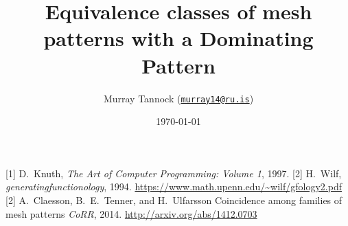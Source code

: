 \documentclass[11pt, aspectratio=1610]{beamer}
\title[Dominating Patterns]{Equivalence classes of mesh patterns with a Dominating Pattern}
\author[M.~Tannock]{Murray Tannock (\href{mailto:murray14@ru.is}{\texttt{murray14@ru.is}})}
\institute[Reykjavik University]
{
\texttt{[image: rulogo]}
}
\date{\today}
\begin{document}
  \begin{frame}
    \titlepage
  \end{frame}





\begin{thebibliography}{10}
  [1]
    D.~Knuth,
    \newblock
    \newblock \emph{The Art of Computer Programming: Volume 1}, 1997.
  [2]
    H.~Wilf,
    \newblock
    \newblock \emph{generatingfunctionology}, 1994.
    \url{https://www.math.upenn.edu/~wilf/gfology2.pdf}
  [2]
    A.~Claesson, B.~E.~Tenner, and H.~Ulfarsson
    \newblock Coincidence among families of mesh patterns
    \newblock \emph{CoRR}, 2014.
    \url{http://arxiv.org/abs/1412.0703}
  \end{thebibliography}
\end{document}
